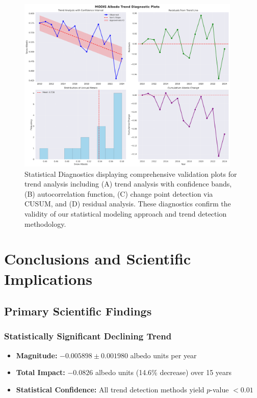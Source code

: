 \documentclass[12pt,a4paper]{article}
\newcommand{\pvalue}{$p$-value}
\begin{document}
\begin{figure}[H]
\centering
\includegraphics[width=0.95\textwidth]{plots/trend_diagnostics.png}
\caption{Statistical Diagnostics displaying comprehensive validation plots for trend analysis including (A) trend analysis with confidence bands, (B) autocorrelation function, (C) change point detection via CUSUM, and (D) residual analysis. These diagnostics confirm the validity of our statistical modeling approach and trend detection methodology.}
\label{fig:trend_diagnostics}
\end{figure}

\section{Conclusions and Scientific Implications}

\subsection{Primary Scientific Findings}

\subsubsection{Statistically Significant Declining Trend}
\begin{itemize}
    \item \textbf{Magnitude:} $-0.005898 \pm 0.001980$ albedo units per year
    \item \textbf{Total Impact:} $-0.0826$ albedo units (14.6\% decrease) over 15 years
    \item \textbf{Statistical Confidence:} All trend detection methods yield \pvalue{} $< 0.01$
\end{itemize}
\end{document}
